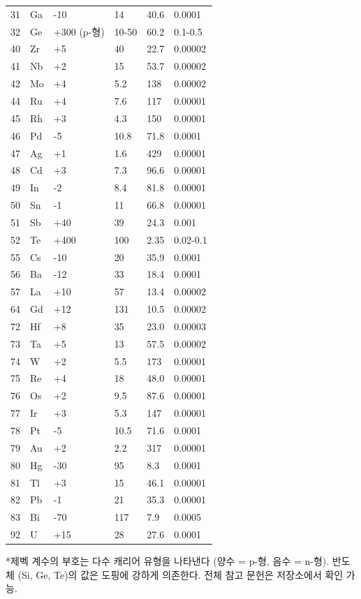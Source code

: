 \documentclass[12pt,a4paper]{article}
\begin{document}
\begin{longtable}{p{0.8cm}p{1.2cm}p{2.2cm}p{2.2cm}p{2.2cm}p{2.2cm}}
		31 & Ga & -10 & 14 & 40.6 & 0.0001 \\
		32 & Ge & +300 (p-형) & 10-50 & 60.2 & 0.1-0.5 \\
		40 & Zr & +5 & 40 & 22.7 & 0.00002 \\
		41 & Nb & +2 & 15 & 53.7 & 0.00002 \\
		42 & Mo & +4 & 5.2 & 138 & 0.00002 \\
		44 & Ru & +4 & 7.6 & 117 & 0.00001 \\
		45 & Rh & +3 & 4.3 & 150 & 0.00001 \\
		46 & Pd & -5 & 10.8 & 71.8 & 0.0001 \\
		47 & Ag & +1 & 1.6 & 429 & 0.00001 \\
		48 & Cd & +3 & 7.3 & 96.6 & 0.00001 \\
		49 & In & -2 & 8.4 & 81.8 & 0.00001 \\
		50 & Sn & -1 & 11 & 66.8 & 0.00001 \\
		51 & Sb & +40 & 39 & 24.3 & 0.001 \\
		52 & Te & +400 & 100 & 2.35 & 0.02-0.1 \\
		55 & Cs & -10 & 20 & 35.9 & 0.0001 \\
		56 & Ba & -12 & 33 & 18.4 & 0.0001 \\
		57 & La & +10 & 57 & 13.4 & 0.00002 \\
		64 & Gd & +12 & 131 & 10.5 & 0.00002 \\
		72 & Hf & +8 & 35 & 23.0 & 0.00003 \\
		73 & Ta & +5 & 13 & 57.5 & 0.00002 \\
		74 & W  & +2 & 5.5 & 173 & 0.00001 \\
		75 & Re & +4 & 18 & 48.0 & 0.00001 \\
		76 & Os & +2 & 9.5 & 87.6 & 0.00001 \\
		77 & Ir & +3 & 5.3 & 147 & 0.00001 \\
		78 & Pt & -5 & 10.5 & 71.6 & 0.0001 \\
		79 & Au & +2 & 2.2 & 317 & 0.00001 \\
		80 & Hg & -30 & 95 & 8.3 & 0.0001 \\
		81 & Tl & +3 & 15 & 46.1 & 0.00001 \\
		82 & Pb & -1 & 21 & 35.3 & 0.00001 \\
		83 & Bi & -70 & 117 & 7.9 & 0.0005 \\
		92 & U  & +15 & 28 & 27.6 & 0.0001 \\
		\bottomrule
	\end{longtable}
	*제벡 계수의 부호는 다수 캐리어 유형을 나타낸다 (양수 = p-형, 음수 = n-형). 반도체 (Si, Ge, Te)의 값은 도핑에 강하게 의존한다. 전체 참고 문헌은 저장소에서 확인 가능.
	
\end{document}

